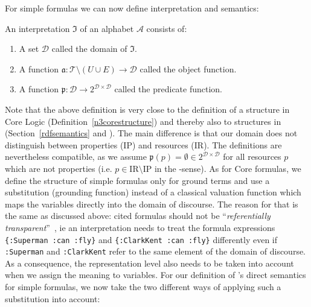 For simple formulas we can now define interpretation and semantics:

\begin{definition}[Interpretation]
An interpretation $\mathfrak{I}$ of
an \nthree alphabet $\mathcal{A}$ consists of:
\begin{enumerate}
\item A set $\mathcal{D}$ called the domain of $\mathfrak{I}$.
\item A function $\mathfrak{a}: 
\mathcal{T}\setminus (U\cup E) \rightarrow \mathcal{D}$ called the object function.
\item A function $\mathfrak{p}:
\mathcal{D} \rightarrow 2^{\mathcal{D} \times \mathcal{D}}$ called the predicate function.
\end{enumerate}
\end{definition}

Note that the above definition is very close to the definition of a structure in \nthree Core Logic (Definition~\ref{n3corestructure}) 
and thereby also to structures in \rdf (Section~\ref{rdfsemantics} and \cite{RDFSemantics}).
The main difference is that our domain does not distinguish between properties (IP) 
and resources (IR). 
The definitions are nevertheless compatible, as we assume $\mathfrak{p}(p)=\emptyset\in 2^{\mathcal{D} \times \mathcal{D}}$
for all resources $p$ which are not properties (i.e. $p \in \text{IR}\setminus \text{IP}$ in the \rdf-sense). 
% 
As for \nthree Core formulas, we define the structure of simple \nthree formulas only for ground terms and use a substitution (grounding function) instead of a classical valuation 
function which maps the variables directly into the domain of discourse. The reason for that is the same as discussed above: cited formulas should not be ``\emph{referentially transparent}''~\cite[p.7]{N3Logic}, ie 
an interpretation needs to treat the formula expressions \texttt{\{:Superman :can :fly\}} and \texttt{\{:ClarkKent :can :fly\}} differently even if \texttt{:Superman} and \texttt{:ClarkKent} refer to the same 
element of the domain of discourse. As a consequence, the representation level also needs to be taken into account when we assign the meaning to variables.
For our definition of \nthree's direct semantics for simple formulas, we now take the two different ways of applying such a substitution into account:





